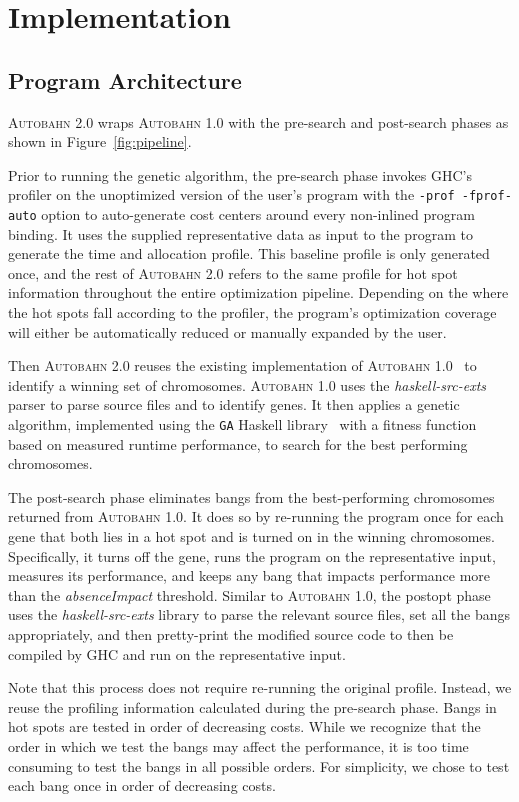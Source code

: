 \documentclass[format=sigplan, review=true]{acmart}
\newcommand{\figref}[1]{Figure~\ref{#1}}
\newcommand{\hotspot}[0]{hot spot}
\newcommand{\hotspots}[0]{hot spots}
\newcommand{\Ao}[0]{\textsc{Autobahn 1.0}}
\newcommand{\At}[0]{\textsc{Autobahn 2.0}}
\newcommand{\preopt}[0]{pre-search}
\newcommand{\postopt}[0]{post-search}
\newcommand{\absim}[0]{\textit{absenceImpact}}
\begin{document}
\section{Implementation}

\subsection{Program Architecture}
\At{} wraps \Ao{} with the  \preopt{} and \postopt{} phases as shown
in \figref{fig:pipeline}.  

Prior to running the genetic algorithm, the \preopt{} phase invokes
GHC's profiler on the unoptimized version of the user's program with
the \texttt{-prof -fprof-auto} option to auto-generate cost centers
around every non-inlined program binding.  It uses the supplied
representative data as input to the program to generate the time and
allocation profile.  This baseline profile is only generated once, and
the rest of \At{} refers to the same profile for \hotspot{}
information throughout the entire optimization pipeline.
Depending on the where the \hotspots{} fall according to the profiler, 
the program's optimization coverage will either be
automatically reduced or manually expanded by the user.

Then \At{} reuses the existing implementation
of \Ao{}~\cite{autobahn-wang} to identify a winning set of 
chromosomes.
\Ao{} uses the \textit{haskell-src-exts}~\cite{langexts} parser to parse
source files and to identify genes.  
It then applies a genetic algorithm,
implemented using the \texttt{GA} Haskell library~\cite{genetic}
with a fitness function based on measured runtime performance, to search for the best performing chromosomes.

The \postopt{} phase eliminates bangs from the best-performing
chromosomes returned from \Ao{}.  It does so by re-running the program
once for each gene that both lies in a \hotspot{} and is turned on in
the winning chromosomes.  Specifically, it turns off the gene, runs
the program on the representative input, measures its performance, and
keeps any bang that impacts performance more than the \absim{}
threshold.  Similar to \Ao{}, the postopt{} phase uses
the \textit{haskell-src-exts} library to parse the relevant source
files, set all the bangs appropriately, and then pretty-print the
modified source code to then be compiled by GHC and run on the
representative input. 

Note that this process does not require re-running the original
profile.  Instead, we reuse the profiling information calculated
during the \preopt{} phase.  Bangs in \hotspots{} are tested in order
of decreasing costs. While we recognize that the order in which we
test the bangs may affect the performance, it is too time consuming to
test the bangs in all possible orders.  For simplicity, we chose to
test each bang once in order of decreasing costs.
\end{document}
